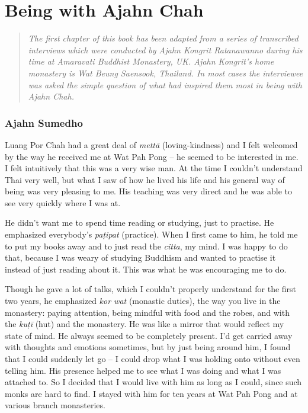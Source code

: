 
\chapter{Being with Ajahn Chah}

\begin{quote}\itshape
The first chapter of this book has been adapted from a series of transcribed interviews which were conducted by Ajahn Kongrit Ratanawanno during his time at Amaravati Buddhist Monastery, UK. Ajahn Kongrit's home monastery is Wat Beung Saensook, Thailand. In most cases the interviewee was asked the simple question of what had inspired them most in being with Ajahn Chah.
\end{quote}

\subsection{Ajahn Sumedho}

Luang Por Chah had a great deal of \emph{mettā} (loving-kindness) and I
felt welcomed by the way he received me at Wat Pah Pong -- he seemed to
be interested in me. I felt intuitively that this was a very wise man. 
At the time I couldn't understand Thai very well, but what I saw of how
he lived his life and his general way of being was very pleasing to me. 
His teaching was very direct and he was able to see very quickly where I
was at. 

He didn't want me to spend time reading or studying, just to practise. 
He emphasized everybody's \emph{paṭipat} (practice). When I first came
to him, he told me to put my books away and to just read the
\emph{citta}, my mind. I was happy to do that, because I was weary of
studying Buddhism and wanted to practise it instead of just reading
about it. This was what he was encouraging me to do. 

Though he gave a lot of talks, which I couldn't properly understand for
the first two years, he emphasized \emph{kor wat} (monastic duties), the
way you live in the monastery: paying attention, being mindful with food
and the robes, and with the \emph{kuṭī} (hut) and the monastery. He was
like a mirror that would reflect my state of mind. He always seemed to
be completely present. I'd get carried away with thoughts and emotions
sometimes, but by just being around him, I found that I could suddenly
let go -- I could drop what I was holding onto without even telling him. 
His presence helped me to see what I was doing and what I was attached
to. So I decided that I would live with him as long as I could, since
such monks are hard to find. I stayed with him for ten years at Wat Pah
Pong and at various branch monasteries. 

